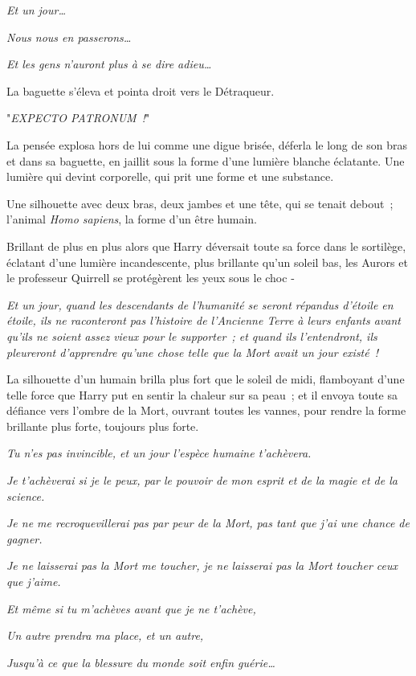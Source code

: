 \emph{Et un jour…}

\emph{Nous nous en passerons…}

\emph{Et les gens n'auront plus à se dire adieu…}

La baguette s'éleva et pointa droit vers le Détraqueur.

"\emph{EXPECTO PATRONUM~!}"

La pensée explosa hors de lui comme une digue brisée, déferla le long de son bras et dans sa baguette, en jaillit sous la forme d'une lumière blanche éclatante. Une lumière qui devint corporelle, qui prit une forme et une substance.

Une silhouette avec deux bras, deux jambes et une tête, qui se tenait debout~; l'animal \emph{Homo sapiens}, la forme d'un être humain.

Brillant de plus en plus alors que Harry déversait toute sa force dans le sortilège, éclatant d'une lumière incandescente, plus brillante qu'un soleil bas, les Aurors et le professeur Quirrell se protégèrent les yeux sous le choc -

\emph{Et un jour, quand les descendants de l'humanité se seront répandus d'étoile en étoile, ils ne raconteront pas l'histoire de l'Ancienne Terre à leurs enfants avant qu'ils ne soient assez vieux pour le supporter~; et quand ils l'entendront, ils pleureront d'apprendre qu'une chose telle que la Mort avait un jour existé~!}

La silhouette d'un humain brilla plus fort que le soleil de midi, flamboyant d'une telle force que Harry put en sentir la chaleur sur sa peau~; et il envoya toute sa défiance vers l'ombre de la Mort, ouvrant toutes les vannes, pour rendre la forme brillante plus forte, toujours plus forte.

\emph{Tu n'es pas invincible, et un jour l'espèce humaine t'achèvera.}

\emph{Je t'achèverai si je le peux, par le pouvoir de mon esprit et de la magie et de la science.}

\emph{Je ne me recroquevillerai pas par peur de la Mort, pas tant que j'ai une chance de gagner.}

\emph{Je ne laisserai pas la Mort me toucher, je ne laisserai pas la Mort toucher ceux que j'aime.}

\emph{Et même si tu m'achèves avant que je ne t'achève,}

\emph{Un autre prendra ma place, et un autre,}

\emph{Jusqu'à ce que la blessure du monde soit enfin guérie…}

